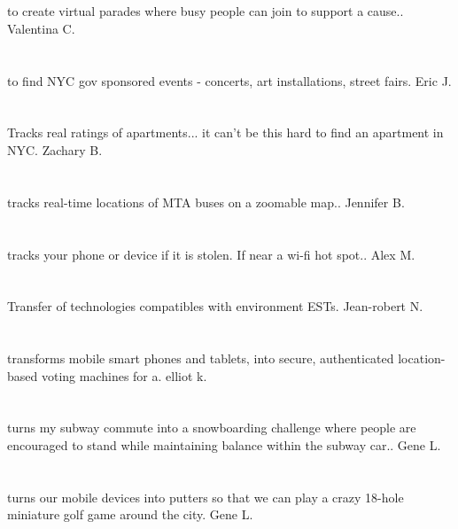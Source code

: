 \section{}to create virtual parades where busy people can join to support a cause.. Valentina C.
\section{}to find NYC gov sponsored events - concerts,  art installations,  street fairs. Eric J.
\section{}Tracks real ratings of apartments... it can't be this hard to find an apartment in NYC. Zachary B.
\section{}tracks real-time locations of MTA buses on a zoomable map.. Jennifer B.
\section{}tracks your phone or device if it is stolen. If near a wi-fi hot spot.. Alex M.
\section{}Transfer of technologies compatibles with environment ESTs. Jean-robert N.
\section{}transforms mobile smart phones and tablets‚ into secure,  authenticated location-based voting machines for a. elliot k.
\section{} turns my subway commute into a snowboarding challenge where people are encouraged to stand while maintaining balance within the subway car.. Gene L.
\section{}turns our mobile devices into putters so that we can play a crazy 18-hole miniature golf game around the city. Gene L.

